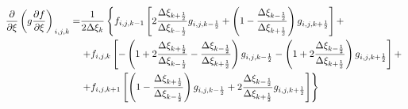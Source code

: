 \begin{equation*}
    \begin{split}
        \left.
            \frac
                {\partial}
                {\partial \xi}
            \left(
                g
                \frac
                    {\partial f}
                    {\partial \xi}
            \right)
        \right._{i, j, k}
        = &
        \frac
            {1}
            {
                2
                \Delta \xi_{k}
            }
        \left\{
            f_{i, j, k - 1}
            \left[
                2
                \frac
                    {\Delta \xi_{k + \frac{1}{2}}}
                    {\Delta \xi_{k - \frac{1}{2}}}
                g_{i, j, k-\frac{1}{2}}
                +
                \left(
                    1
                    -
                    \frac
                        {\Delta \xi_{k - \frac{1}{2}}}
                        {\Delta \xi_{k + \frac{1}{2}}}
                \right)
                g_{i, j, k+\frac{1}{2}}
            \right]
            +
        \right.
        \\ &
        \left.
            +
            f_{i, j, k}
            \left[
                -
                \left(
                    1
                    +
                    2
                    \frac
                        {\Delta \xi_{k + \frac{1}{2}}}
                        {\Delta \xi_{k - \frac{1}{2}}}
                    -
                    \frac
                        {\Delta \xi_{k - \frac{1}{2}}}
                        {\Delta \xi_{k + \frac{1}{2}}}
                \right)
                g_{i, j, k - \frac{1}{2}}
                -
                \left(
                    1
                    +
                    2
                    \frac
                        {\Delta \xi_{k - \frac{1}{2}}}
                        {\Delta \xi_{k + \frac{1}{2}}}
                \right)
                g_{i, j, k + \frac{1}{2}}
            \right]
            +
        \right.
        \\ &
        \left.
            +
            f_{i, j, k + 1}
            \left[
                \left(
                    1
                    -
                    \frac
                        {\Delta \xi_{k + \frac{1}{2}}}
                        {\Delta \xi_{k - \frac{1}{2}}}
                \right)
                g_{i, j, k - \frac{1}{2}}
                +
                2
                \frac
                    {\Delta \xi_{k - \frac{1}{2}}}
                    {\Delta \xi_{k + \frac{1}{2}}}
                g_{i, j, k + \frac{1}{2}}
            \right]
        \right\}
    \end{split}
\end{equation*}

